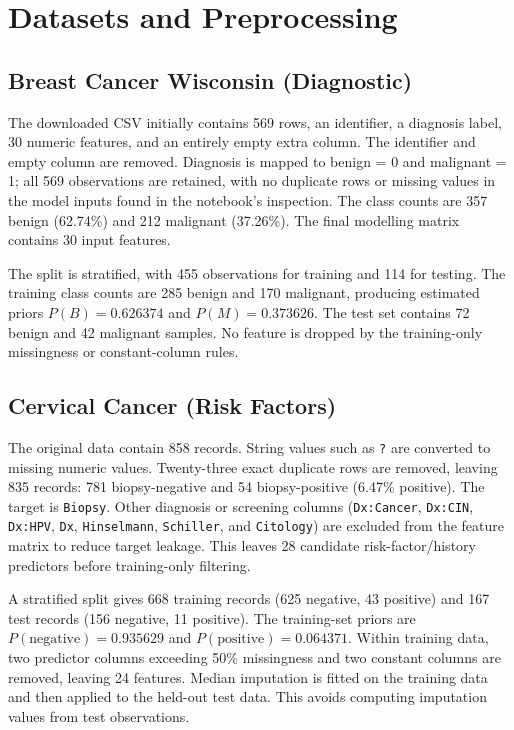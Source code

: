 \documentclass[conference]{IEEEtran}
\begin{document}
\section{Datasets and Preprocessing}
\subsection{Breast Cancer Wisconsin (Diagnostic)}
The downloaded CSV initially contains 569 rows, an identifier, a diagnosis label, 30 numeric features, and an entirely empty extra column. The identifier and empty column are removed. Diagnosis is mapped to benign = 0 and malignant = 1; all 569 observations are retained, with no duplicate rows or missing values in the model inputs found in the notebook's inspection. The class counts are 357 benign (62.74\%) and 212 malignant (37.26\%). The final modelling matrix contains 30 input features.

The split is stratified, with 455 observations for training and 114 for testing. The training class counts are 285 benign and 170 malignant, producing estimated priors $P(B)=0.626374$ and $P(M)=0.373626$. The test set contains 72 benign and 42 malignant samples. No feature is dropped by the training-only missingness or constant-column rules.

\subsection{Cervical Cancer (Risk Factors)}
The original data contain 858 records. String values such as \texttt{?} are converted to missing numeric values. Twenty-three exact duplicate rows are removed, leaving 835 records: 781 biopsy-negative and 54 biopsy-positive (6.47\% positive). The target is \texttt{Biopsy}. Other diagnosis or screening columns (\texttt{Dx:Cancer}, \texttt{Dx:CIN}, \texttt{Dx:HPV}, \texttt{Dx}, \texttt{Hinselmann}, \texttt{Schiller}, and \texttt{Citology}) are excluded from the feature matrix to reduce target leakage. This leaves 28 candidate risk-factor/history predictors before training-only filtering.

A stratified split gives 668 training records (625 negative, 43 positive) and 167 test records (156 negative, 11 positive). The training-set priors are $P(\text{negative})=0.935629$ and $P(\text{positive})=0.064371$. Within training data, two predictor columns exceeding 50\% missingness and two constant columns are removed, leaving 24 features. Median imputation is fitted on the training data and then applied to the held-out test data. This avoids computing imputation values from test observations.
\end{document}
